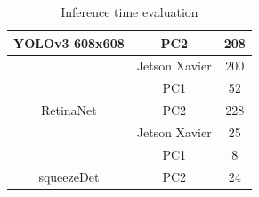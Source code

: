 \documentclass[twoside]{ctuthesis}
\theoremstyle{plain}
\theoremstyle{definition}
\theoremstyle{note}
\begin{document}
\begin{table}[]
\begin{tabular}{|c|c|c|}
\multirow{-3}{*}{YOLOv3 608x608}                                                & PC2                                                                               & 208                                                                                               \\ \hline												
& Jetson Xavier                                                                     & 200                                                                                               \\ \cline{2-3}												
& PC1                                                                               & 52                                                                                                \\ \cline{2-3}												
\multirow{-3}{*}{RetinaNet}                                                     & PC2                                                                               & 228                                                                                               \\ \hline												
& Jetson Xavier                                                                     & 25                                                                                                \\ \cline{2-3}												
& PC1                                                                               & 8                                                                                                 \\ \cline{2-3}												
\multirow{-3}{*}{squeezeDet}                                                    & PC2                                                                               & 24                                                                                                \\ \hline												
\end{tabular}	
\caption{Inference time evaluation}
\label{inference_time}										
\end{table}												
\end{document}
